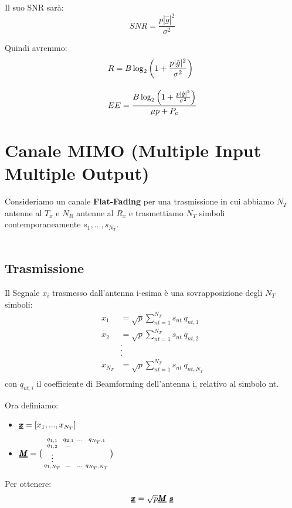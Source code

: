 Il suo SNR sarà:
\begin{equation*}
    SNR = \frac{p|\hat{g}|^2}{\sigma^2}
\end{equation*}

Quindi avremmo:
\begin{equation*}
    \begin{aligned}
    &R = B\log_2\left(1 + \frac{p|\hat{g}|^2}{\sigma^2}\right)
    \\[10pt]
    &EE = \frac{B\log_2\left(1 + \frac{p|\hat{g}|^2}{\sigma^2}\right)}{\mu p + P_c}
    \end{aligned}
\end{equation*}
\pagebreak 


\section{Canale MIMO (Multiple Input Multiple Output)}
Consideriamo un canale \textbf{Flat-Fading} per una trasmissione in cui abbiamo $N_T$ antenne al $T_x$ e $N_R$ antenne al $R_x$ e trasmettiamo $N_T$ simboli contemporaneamente $s_1, ..., s_{N_T}$.\\
\\

\subsection{Trasmissione}
Il Segnale $x_{i}$ trasmesso dall'antenna i-esima è una sovrapposizione degli $N_T$ simboli:
\begin{equation*}
    \begin{aligned}
    x_1 &= \sqrt{p} \sum_{nt=1}^{N_T} s_{nt} \ q_{nt,1} \\
    x_2 &= \sqrt{p} \sum_{nt=1}^{N_T} s_{nt} \ q_{nt,2} \\
    &.\\&.\\&.\\
    x_{N_T} &= \sqrt{p} \sum_{nt=1}^{N_T} s_{nt} \ q_{nt,N_T} \\
    \end{aligned}
\end{equation*}
con $q_{nt,i}$ il coefficiente di Beamforming dell'antenna i, relativo al simbolo nt.

Ora definiamo:
\begin{itemize}
    \item $\pmb{\underline{x}} = [x_1, ..., x_{N_T}]$
    \item $\pmb{\underline{M}} = \bigl(
    \begin{smallmatrix}
    q_{1,1} & q_{2,1} & \dots &  q_{N_T,1} \\
    q_{1,2} & \dots & \\
    \vdots\\
    q_{1,N_T} & \dots & \dots & q_{N_T,N_T}
    \end{smallmatrix}
    \bigr) $
\end{itemize}
Per ottenere:
\begin{equation*}
    \vc{x} = \sqrt{p} \vc{M} \ \vc{s}
\end{equation*}

